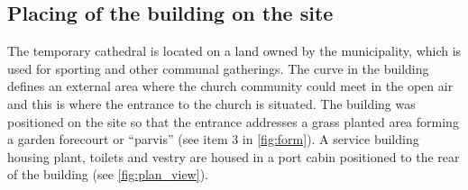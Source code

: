 
\subsection{Placing of the building on the site}
The temporary cathedral is located on a land owned by the municipality, which is used for sporting and other communal gatherings. The curve in the building defines an external area where the church community could meet in the open air and this is where the entrance to the church is situated. The building was positioned on the site so that the entrance addresses a grass planted area forming a garden forecourt or “parvis” (see item 3 in \cref{fig:form}). A service building housing plant, toilets and vestry are housed in a port cabin positioned to the rear of the building (see \cref{fig:plan_view}).

